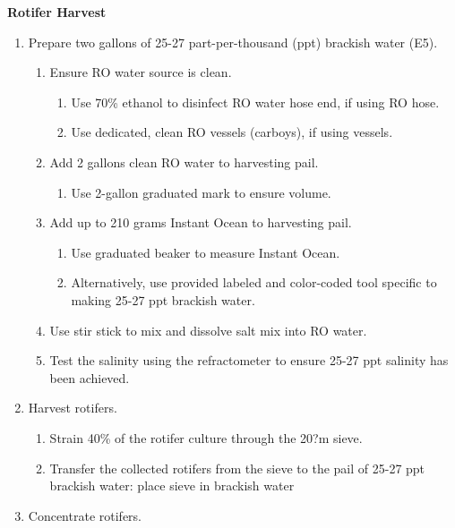 \documentclass[
  letterpaper,
  DIV=11,
  numbers=noendperiod]{scrreprt}
\providecommand{\tightlist}{%
  \setlength{\itemsep}{0pt}\setlength{\parskip}{0pt}}\usepackage{longtable,booktabs,array}
\begin{document}
\textbf{Rotifer Harvest}

\begin{enumerate}
\def\labelenumi{\arabic{enumi}.}
\item
  Prepare two gallons of 25-27 part-per-thousand (ppt) brackish water
  (E5).

  \begin{enumerate}
  \def\labelenumii{\arabic{enumii}.}
  \tightlist
  \item
    Ensure RO water source is clean.

    \begin{enumerate}
    \def\labelenumiii{\arabic{enumiii}.}
    \tightlist
    \item
      Use 70\% ethanol to disinfect RO water hose end, if using RO hose.
    \item
      Use dedicated, clean RO vessels (carboys), if using vessels.
    \end{enumerate}
  \item
    Add 2 gallons clean RO water to harvesting pail.

    \begin{enumerate}
    \def\labelenumiii{\arabic{enumiii}.}
    \tightlist
    \item
      Use 2-gallon graduated mark to ensure volume.
    \end{enumerate}
  \item
    Add up to 210 grams Instant Ocean to harvesting pail.

    \begin{enumerate}
    \def\labelenumiii{\arabic{enumiii}.}
    \tightlist
    \item
      Use graduated beaker to measure Instant Ocean.
    \item
      Alternatively, use provided labeled and color-coded tool specific
      to making 25-27 ppt brackish water.
    \end{enumerate}
  \item
    Use stir stick to mix and dissolve salt mix into RO water.
  \item
    Test the salinity using the refractometer to ensure 25-27 ppt
    salinity has been achieved.
  \end{enumerate}
\item
  Harvest rotifers.

  \begin{enumerate}
  \def\labelenumii{\arabic{enumii}.}
  \tightlist
  \item
    Strain 40\% of the rotifer culture through the 20?m sieve.
  \item
    Transfer the collected rotifers from the sieve to the pail of 25-27
    ppt brackish water: place sieve in brackish water
  \end{enumerate}
\item
  Concentrate rotifers.


\end{enumerate}
\end{document}
